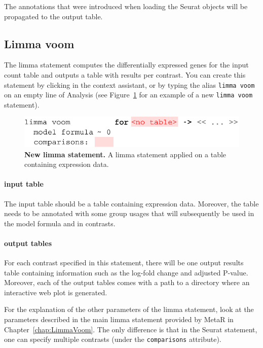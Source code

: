 The annotations that were introduced when loading the Seurat objects will be propagated to the output table.

\subsection{Limma voom}
The limma statement computes the differentially expressed genes for the input count table and outputs
a table with results per contrast. You can create this statement by clicking
 in the context assistant, or by typing
the alias \texttt{limma voom} on an empty line of Analysis (see Figure~\ref{fig:LimmaSeurat}
for an example of a new \texttt{limma voom} statement).

\begin{figure}[h!tbp]
  \centering
    \includegraphics[width=\figWidthWide]{figures/LimmaSeurat.pdf}
    \caption[New limma statement.]{\textbf{New limma statement.} A limma statement applied on
    a table containing expression data.}
\label{fig:LimmaSeurat}
\end{figure}

\paragraph{input table} The input table should be a table containing expression data. Moreover,
the table needs to be annotated with some group usages that will subsequently be used in the
model formula and in contrasts.

\paragraph{output tables} For each contrast specified in this statement, there will be one
output results table containing information such as the log-fold change and adjusted P-value.
Moreover, each of the output tables comes with a path to a directory where an interactive
web plot is generated.

For the explanation of the other parameters of the limma statement, look at the parameters described in the
main limma statement provided by MetaR in Chapter~\ref{chap:LimmaVoom}. The only difference is that
in the Seurat statement, one can specify multiple contrasts (under the \texttt{comparisons} attribute).

